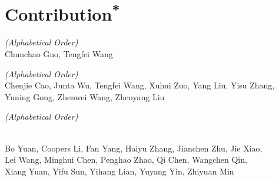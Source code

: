 \documentclass{article} %
\begin{document}
\clearpage



 
\section*{Contribution\textsuperscript{*}}
\let\thefootnote\relax
{}
\addtocounter{footnote}{-1}  

 

  
 \textit{(Alphabetical Order)} \\[4pt]
\hspace{1.2em} Chunchao Guo, Tengfei Wang

\vspace{0.4cm}

 \textit{(Alphabetical Order)} \\[4pt]
\hspace{1.2em} Chenjie Cao, Junta Wu, Tengfei Wang, Xuhui Zuo, Yang Liu, Yisu Zhang, \\
\hspace{1.2em} Yuning Gong, Zhenwei Wang, Zhenyang Liu

\vspace{0.4cm}

 \textit{(Alphabetical Order)} 

\vspace{0.2cm}

 \\[3pt]
\hspace{1.8em} Bo Yuan, Coopers Li, Fan Yang, Haiyu Zhang, Jianchen Zhu, Jie Xiao, \\
\hspace{1.8em} Lei Wang, Minghui Chen, Penghao Zhao, Qi Chen, Wangchen Qin, \\
\hspace{1.8em} Xiang Yuan, Yifu Sun, Yihang Lian, Yuyang Yin, Zhiyuan Min
\end{document}
